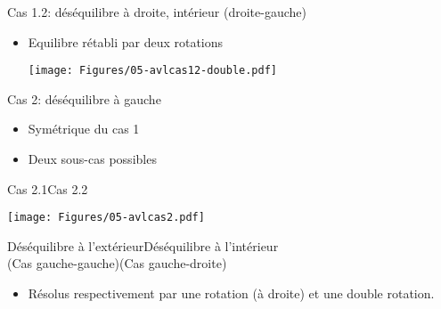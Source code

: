 \begin{frame}{Cas 1.2: déséquilibre à droite, intérieur (droite-gauche)}
\begin{itemize}
\item Equilibre rétabli par deux rotations

\begin{center}
\texttt{[image: Figures/05-avlcas12-double.pdf]}
\end{center}

\end{itemize}

\end{frame}

\begin{frame}{Cas 2: déséquilibre à gauche}
\begin{itemize}
\item Symétrique du cas 1
\item Deux sous-cas possibles
\end{itemize}

\begin{center}
Cas 2.1\hspace{4cm}Cas 2.2

\medskip

\texttt{[image: Figures/05-avlcas2.pdf]}

\medskip
Déséquilibre à l'extérieur\hspace{1.3cm}Déséquilibre à l'intérieur\\
(Cas gauche-gauche)\hspace{2cm}(Cas gauche-droite)
\end{center}

\begin{itemize}
\item Résolus respectivement par une rotation (à droite) et une double rotation.
\end{itemize}

\end{frame}

